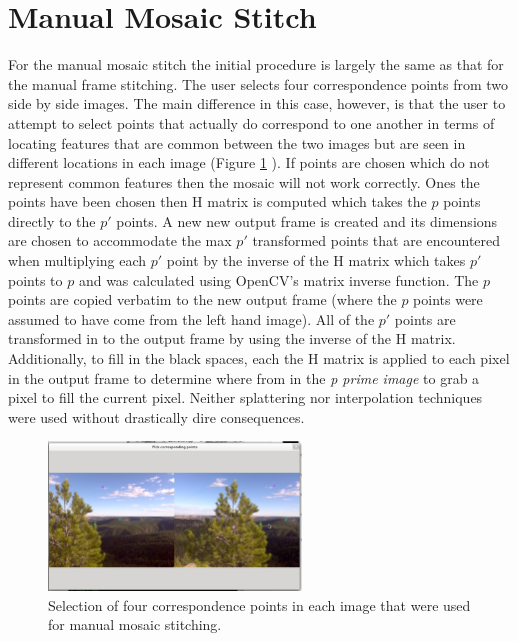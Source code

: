 \documentclass[10pt,twocolumn,letterpaper]{article}
\begin{document}
\section{Manual Mosaic Stitch}
For the manual mosaic stitch the initial procedure is largely the same as that for the manual frame stitching. The user selects four correspondence points from two side by side images. The main difference in this case, however, is that the user to attempt to select points that actually do correspond to one another in terms of locating features that are common between the two images but are seen in different locations in each image (Figure \ref{fig:man_mosaic_points} ). If points are chosen which do not represent common features then the mosaic will not work correctly. Ones the points have been chosen then H matrix is computed which takes  the $p$ points directly to the $p'$ points. A new new output frame is created and its dimensions are chosen to accommodate the max $p'$ transformed points that are encountered when multiplying each $p'$ point by the inverse of the H matrix which takes $p'$ points to $p$ and was calculated using OpenCV's matrix inverse function. The $p$ points are copied verbatim to the new output frame (where the $p$ points were assumed to have come from the left hand image). All of the $p'$ points are transformed in to the output frame by using the inverse of the H matrix. Additionally, to fill in the black spaces, each the H matrix is applied to each pixel in the output frame to determine where from in the \emph{p prime image } to grab a pixel to fill the current pixel. Neither splattering nor interpolation techniques were used without drastically dire consequences.

\begin{figure}[ht!]
\centering
\includegraphics[width=0.6\textwidth]{img/manual_mosaic_points.eps}
\caption{Selection of four correspondence points in each image that were used for manual mosaic stitching.}
\label{fig:man_mosaic_points}
\end{figure}
{\small


}
\end{document}
